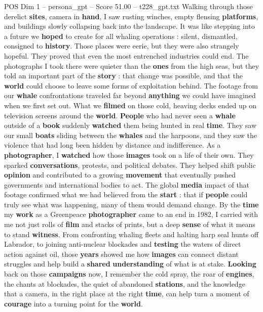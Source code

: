 \begin{textsample}{POS Dim 1 – persona\_gpt – Score 51.00 – t228\_gpt.txt}
Walking through those derelict \textbf{sites}, camera in \textbf{hand}, I saw rusting winches, empty flensing \textbf{platforms}, and buildings slowly collapsing back into the landscape.
It was like stepping into a future we \textbf{hoped} to create for all whaling operations : silent, dismantled, consigned to \textbf{history}.
Those places were eerie, but they were also strangely hopeful.
They proved that even the most entrenched industries could end.
The photographs I took there were quieter than the \textbf{ones} from the high seas, but they told an important part of the \textbf{story} : that change was possible, and that the \textbf{world} could choose to leave some forms of exploitation behind.
The footage from our \textbf{whale} confrontations traveled far beyond \textbf{anything} we could have imagined when we first set out.
What we \textbf{filmed} on those cold, heaving decks ended up on television screens around the \textbf{world}. \textbf{People} who had never seen a \textbf{whale} outside of a \textbf{book} suddenly \textbf{watched} them being hunted in real \textbf{time}.
They saw our small \textbf{boats} sliding between the \textbf{whales} and the harpoons, and they saw the violence that had long been hidden by distance and indifference.
As a \textbf{photographer}, I \textbf{watched} how those \textbf{images} took on a life of their own.
They sparked \textbf{conversations}, protests, and political debates.
They helped shift public \textbf{opinion} and contributed to a growing \textbf{movement} that eventually pushed governments and international bodies to act.
The global \textbf{media} impact of that footage confirmed what we had believed from the \textbf{start} : that if \textbf{people} could truly see what was happening, many of them would demand change.
By the \textbf{time} my \textbf{work} as a Greenpeace \textbf{photographer} came to an end in 1982, I carried with me not just rolls of \textbf{film} and stacks of prints, but a deep \textbf{sense} of what it means to stand \textbf{witness}.
From confronting whaling fleets and halting harp seal hunts off Labrador, to joining anti-nuclear blockades and \textbf{testing} the waters of direct action against oil, those \textbf{years} showed me how \textbf{images} can connect distant struggles and help build a \textbf{shared} \textbf{understanding} of what is at stake. \textbf{Looking} back on those \textbf{campaigns} now, I remember the cold spray, the roar of \textbf{engines}, the chants at blockades, the quiet of abandoned \textbf{stations}, and the knowledge that a camera, in the right place at the right \textbf{time}, can help turn a moment of \textbf{courage} into a turning point for the \textbf{world}.

\end{textsample}
